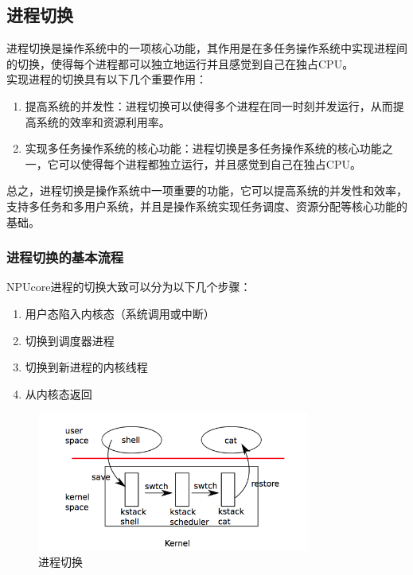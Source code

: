 \subsection{进程切换}
进程切换是操作系统中的一项核心功能，其作用是在多任务操作系统中实现进程间的切换，使得每个进程都可以独立地运行并且感觉到自己在独占CPU。 \\
实现进程的切换具有以下几个重要作用：
\begin{enumerate}
	\item 提高系统的并发性：进程切换可以使得多个进程在同一时刻并发运行，从而提高系统的效率和资源利用率。
	\item 实现多任务操作系统的核心功能：进程切换是多任务操作系统的核心功能之一，它可以使得每个进程都独立运行，并且感觉到自己在独占CPU。
\end{enumerate}
总之，进程切换是操作系统中一项重要的功能，它可以提高系统的并发性和效率，支持多任务和多用户系统，并且是操作系统实现任务调度、资源分配等核心功能的基础。\\

\subsubsection{进程切换的基本流程}
NPUcore进程的切换大致可以分为以下几个步骤：
\begin{enumerate}
	\item 用户态陷入内核态（系统调用或中断）
	\item 切换到调度器进程
	\item 切换到新进程的内核线程
	\item 从内核态返回
\end{enumerate}

\begin{figure}[ht]
	\centering
	\includegraphics[width=0.8\textwidth]{figures/05-02-03-进程切换.png}
	\caption{进程切换}
\end{figure}



\newpage


